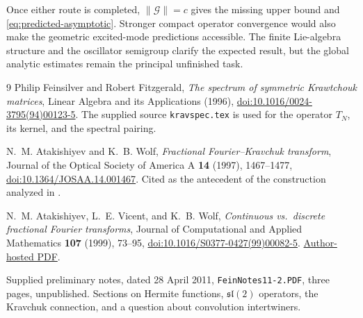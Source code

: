 \documentclass[11pt,reqno]{amsart}
\theoremstyle{definition}\newtheorem{definition}[theorem]{Definition}
\theoremstyle{remark}\newtheorem{remark}[theorem]{Remark}
\newcommand{\norm}[1]{\lVert #1\rVert}
\begin{document}
Once either route is completed, $\norm{\mathcal G}=c$ gives the missing
upper bound and \eqref{eq:predicted-asymptotic}. Stronger compact
operator convergence would also make the geometric excited-mode
predictions accessible. The finite Lie-algebra structure and the
oscillator semigroup clarify the expected result, but the global
analytic estimates remain the principal unfinished task.

\begin{thebibliography}{9}
Philip Feinsilver and Robert Fitzgerald,
\emph{The spectrum of symmetric Krawtchouk matrices},
Linear Algebra and its Applications (1996),
\href{https://doi.org/10.1016/0024-3795(94)00123-5}
{doi:10.1016/0024-3795(94)00123-5}.
The supplied source \texttt{kravspec.tex} is used for the operator
$T_N$, its kernel, and the spectral pairing.

N.~M. Atakishiyev and K.~B. Wolf,
\emph{Fractional Fourier--Kravchuk transform},
Journal of the Optical Society of America A \textbf{14} (1997),
1467--1477,
\href{https://doi.org/10.1364/JOSAA.14.001467}
{doi:10.1364/JOSAA.14.001467}.
Cited as the antecedent of the construction analyzed in \cite{AVW}.

N.~M. Atakishiyev, L.~E. Vicent, and K.~B. Wolf,
\emph{Continuous vs.\ discrete fractional Fourier transforms},
Journal of Computational and Applied Mathematics \textbf{107}
(1999), 73--95,
\href{https://doi.org/10.1016/S0377-0427(99)00082-5}
{doi:10.1016/S0377-0427(99)00082-5}.
\href{https://www.fis.unam.mx/~bwolf/Articles/106.pdf}{Author-hosted PDF}.

Supplied preliminary notes, dated 28 April 2011,
\texttt{FeinNotes11-2.PDF}, three pages, unpublished.
Sections on Hermite functions, $\mathfrak{sl}(2)$ operators, the
Kravchuk connection, and a question about convolution intertwiners.
\end{thebibliography}
\end{document}
